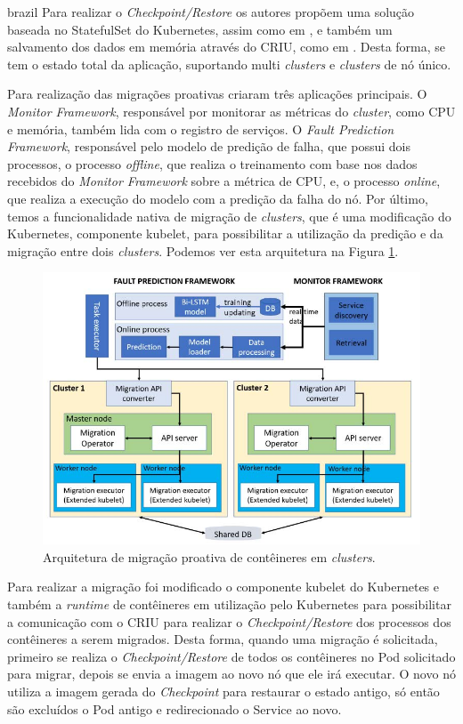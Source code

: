 \begin{otherlanguage*}{brazil}
Para realizar o \textit{Checkpoint/Restore} os autores propõem uma solução
baseada no StatefulSet do Kubernetes, assim como em \cite{vayghan2021kubernetes},
e também um salvamento dos dados em memória através do CRIU, como em
\cite{muller2022architecture}. Desta forma, se tem o estado total da aplicação,
suportando multi \textit{clusters} e \textit{clusters} de nó único.

Para realização das migrações proativas criaram três aplicações
principais. O \textit{Monitor Framework}, responsável por monitorar as métricas
do \textit{cluster}, como CPU e memória, também lida com o registro de serviços.
O \textit{Fault Prediction Framework}, responsável pelo modelo de predição
de falha, que possui dois processos, o processo \textit{offline}, que realiza
o treinamento com base nos dados recebidos do \textit{Monitor Framework} sobre
a métrica de CPU, e, o processo \textit{online}, que realiza a execução do
modelo com a predição da falha do nó. Por último, temos a funcionalidade
nativa de migração de \textit{clusters}, que é uma modificação do Kubernetes,
componente kubelet, para possibilitar a utilização da predição e da migração
entre dois \textit{clusters}. Podemos ver esta arquitetura na Figura \ref{fig:proactive}.

\begin{figure}[h]
\centering
\includegraphics[scale=0.54]{images/proactive-architecture.png}
\caption{Arquitetura de migração proativa de contêineres em \textit{clusters}.}
\label{fig:proactive}
\end{figure}

Para realizar a migração foi modificado o componente kubelet do Kubernetes e
também a \textit{runtime} de contêineres em utilização pelo Kubernetes para
possibilitar a comunicação com o CRIU para realizar o \textit{Checkpoint/Restore}
dos processos dos contêineres a serem migrados. Desta forma, quando uma migração
é solicitada, primeiro se realiza o \textit{Checkpoint/Restore} de todos os
contêineres no Pod solicitado para migrar, depois se envia a imagem ao novo nó
que ele irá executar. O novo nó utiliza a imagem gerada do \textit{Checkpoint}
para restaurar o estado antigo, só então são excluídos o Pod antigo e
redirecionado o Service ao novo.


\end{otherlanguage*}
